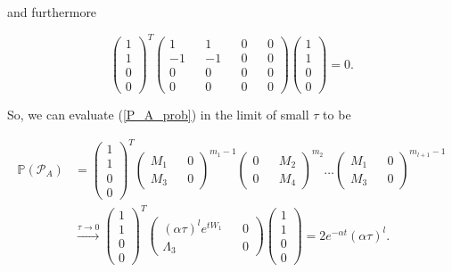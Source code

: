 \documentclass{article}
\begin{document}
and furthermore

\begin{equation}
  \begin{pmatrix} 1 \\ 1 \\ 0 \\ 0 \end{pmatrix}^T \begin{pmatrix} 1 && 1 && 0 && 0 \\ -1 && -1 && 0 && 0 \\ 0 && 0 && 0 && 0 \\ 0 && 0 && 0 && 0\end{pmatrix} \begin{pmatrix} 1 \\ 1 \\ 0 \\ 0 \end{pmatrix} = 0.
\end{equation}

So, we can evaluate (\ref{P_A_prob}) in the limit of small $\tau$ to be

\begin{align}
  \mathbb{P}(\mathcal{P}_A) &=\begin{pmatrix} 1 \\ 1 \\ 0 \\ 0 \end{pmatrix}^T\begin{pmatrix} M_1 && 0 \\ M_3 && 0 \end{pmatrix}^{m_1-1}\begin{pmatrix} 0 && M_2 \\ 0 && M_4 \end{pmatrix}^{m_2}\ldots\begin{pmatrix} M_1 && 0 \\ M_3 && 0 \end{pmatrix}^{m_{l+1}-1} \\
&\xrightarrow{\tau \rightarrow 0} \begin{pmatrix} 1 \\ 1 \\ 0 \\ 0 \end{pmatrix}^T \begin{pmatrix} (\alpha\tau)^le^{tW_1} && 0 \\ \Lambda_3 && 0 \end{pmatrix}\begin{pmatrix} 1 \\ 1 \\ 0 \\ 0 \end{pmatrix} = 2e^{-\alpha t}(\alpha\tau)^l.
\end{align}
\end{document}
